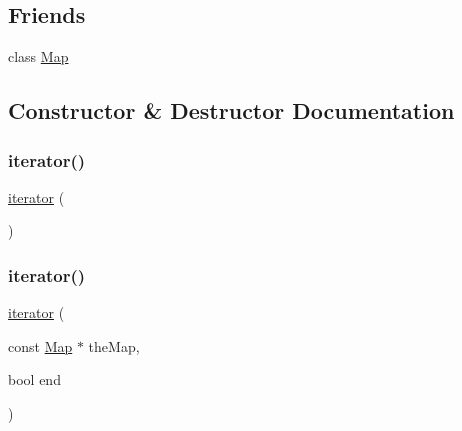 \subsection*{Friends}
\begin{DoxyCompactItemize}
\item 
class \mbox{\hyperlink{classMap_1_1iterator_ad2f32e921244459f7cc6d50355429cc6}{Map}}
\end{DoxyCompactItemize}


\subsection{Constructor \& Destructor Documentation}
\mbox{\label{classMap_1_1iterator_a67d652c2433cf9217ed2a1485092fdd1}} 
\subsubsection{\texorpdfstring{iterator()}{iterator()}\hspace{0.1cm}{\footnotesize\ttfamily [1/3]}}
{\footnotesize\ttfamily \mbox{\hyperlink{classMap_1_1iterator}{iterator}} (\begin{DoxyParamCaption}{ }\end{DoxyParamCaption})\hspace{0.3cm}{\ttfamily [inline]}}

\mbox{\label{classMap_1_1iterator_a963233ec2eced24db44f8d6296317091}} 
\subsubsection{\texorpdfstring{iterator()}{iterator()}\hspace{0.1cm}{\footnotesize\ttfamily [2/3]}}
{\footnotesize\ttfamily \mbox{\hyperlink{classMap_1_1iterator}{iterator}} (\begin{DoxyParamCaption}\item[{const \mbox{\hyperlink{classMap}{Map}} $\ast$}]{the\+Map,  }\item[{bool}]{end }\end{DoxyParamCaption})\hspace{0.3cm}{\ttfamily [inline]}}

